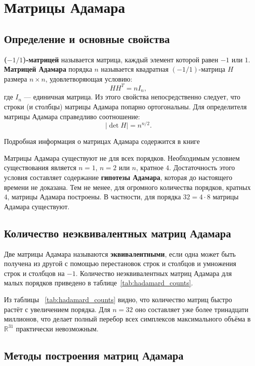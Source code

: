 \documentclass[a4paper,12pt]{article}
\theoremstyle{indented}
\begin{document}
\section{Матрицы Адамара}

\subsection{Определение и основные свойства}

\textbf{($-1/1$)-матрицей} называется матрица, каждый элемент которой равен $-1$ или $1$. \textbf{Матрицей Адамара} порядка $n$ называется квадратная $(-1/1)$-матрица $H$ размера $n \times n$, удовлетворяющая условию:
\[
H H^T = n I_n,
\]
где $I_n$ — единичная матрица. Из этого свойства непосредственно следует, что строки (и столбцы) матрицы Адамара попарно ортогональны. Для определителя матрицы Адамара справедливо соотношение:
\[
|\det H| = n^{n/2}.
\]

Подробная информация о матрицах Адамара содержится в книге \cite{hall_comb_1970}

Матрицы Адамара существуют не для всех порядков. Необходимым условием существования является $n = 1$, $n = 2$ или $n$, кратное $4$. Достаточность этого условия составляет содержание \textbf{гипотезы Адамара}, которая до настоящего времени не доказана. Тем не менее, для огромного количества порядков, кратных $4$, матрицы Адамара построены. В частности, для порядка $32 = 4 \cdot 8$ матрицы Адамара существуют.

\subsection{Количество неэквивалентных матриц Адамара}

Две матрицы Адамара называются \textbf{эквивалентными}, если одна может быть получена из другой с помощью перестановок строк и столбцов и умножения строк и столбцов на $-1$. Количество неэквивалентных матриц Адамара для малых порядков приведено в таблице~\ref{tab:hadamard_counts}.

Из таблицы ~\ref{tab:hadamard_counts} видно, что количество матриц быстро растёт с увеличением порядка. Для $n = 32$ оно составляет уже более тринадцати миллионов, что делает полный перебор всех симплексов максимального объёма в $\mathbb{R}^{31}$ практически невозможным.

\subsection{Методы построения матриц Адамара}
\end{document}
